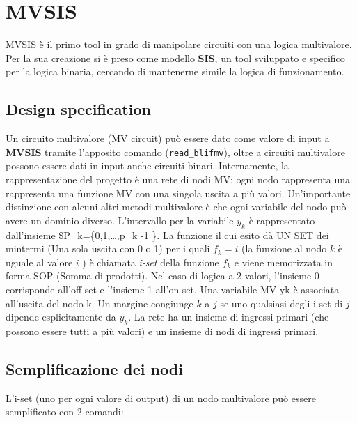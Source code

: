 \documentclass[
  italian,
]{book}
\begin{document}
\newpage

\hypertarget{mvsis}{%
\section{MVSIS}\label{mvsis}}

MVSIS è il primo tool in grado di manipolare circuiti con una logica multivalore. Per la sua creazione si è preso come modello \textbf{SIS}, un tool sviluppato e specifico per la logica binaria, cercando di mantenerne simile la logica di funzionamento.

\hypertarget{design-specification}{%
\subsection{Design specification}\label{design-specification}}

Un circuito multivalore (MV circuit) può essere dato come valore di input a \textbf{MVSIS} tramite l'apposito comando (\texttt{read\_blifmv}), oltre a circuiti multivalore possono essere dati in input anche circuiti binari. Internamente, la rappresentazione del progetto è una rete di nodi MV; ogni nodo rappresenta una rappresenta una funzione MV con una singola uscita a più valori. Un'importante distinzione con alcuni altri metodi multivalore è che ogni variabile del nodo può avere un dominio diverso. L'intervallo per la variabile \(y_k\) è rappresentato dall'insieme \$P\_k=\{0,1,\ldots,p\_k -1 \}. La funzione il cui esito dà UN SET dei mintermi (Una sola uscita con 0 o 1) per i quali \(f_k = i\) (la funzione al nodo \(k\) è uguale al valore \(i\) ) è chiamata \emph{i-set} della funzione \(f_k\) e viene memorizzata in forma SOP (Somma di prodotti). Nel caso di logica a 2 valori, l'insieme 0 corrisponde all'off-set e l'insieme 1 all'on set. Una variabile MV yk è associata all'uscita del nodo k. Un margine congiunge \(k\) a \(j\) se uno qualsiasi degli i-set di \(j\) dipende esplicitamente da \(y_k\). La rete ha un insieme di ingressi primari (che possono essere tutti a più valori) e un insieme di nodi di ingressi primari.

\hypertarget{semplificazione-dei-nodi}{%
\subsection{Semplificazione dei nodi}\label{semplificazione-dei-nodi}}

L'i-set (uno per ogni valore di output) di un nodo multivalore può essere semplificato con 2 comandi:
\end{document}
